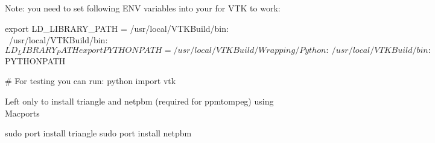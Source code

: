 Note: you need to set following ENV variables into your  for VTK to work:
\begin{shellCode}
export LD_LIBRARY_PATH = /usr/local/VTKBuild/bin: \
             /usr/local/VTKBuild/bin:${LD_LIBRARY_PATH}
export PYTHONPATH = /usr/local/VTKBuild/Wrapping/Python:\ 
            /usr/local/VTKBuild/bin:${PYTHONPATH}
     
#     For testing you can run:
python
import vtk
\end{shellCode}
 
Left only to install triangle and netpbm (required for ppmtompeg) using Macports 
\begin{shellCode}
sudo port install triangle
sudo port install netpbm
\end{shellCode}
 


